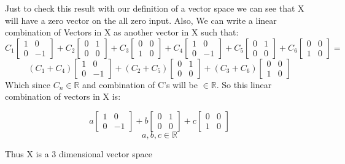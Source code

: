 \documentclass[12pt]{article}
\begin{document}
Just to check this result with our definition of a vector space we can see that X will have a zero vector on the all zero input. Also, We can write a linear combination of Vectors in X as another vector in X such that:
\[
C_1
\begin{bmatrix}
1& 0\\
0 & -1
\end{bmatrix}
+ C_2
\begin{bmatrix}
0 & 1\\
0 & 0
\end{bmatrix}
+ C_3
\begin{bmatrix}
0 & 0\\
1 & 0
\end{bmatrix}
+
C_4
\begin{bmatrix}
1& 0\\
0 & -1
\end{bmatrix}
+ C_5
\begin{bmatrix}
0 & 1\\
0 & 0
\end{bmatrix}
+ C_6
\begin{bmatrix}
0 & 0\\
1 & 0
\end{bmatrix}
=
\]
\[
(C_1 + C_4)
\begin{bmatrix}
1& 0\\
0 & -1
\end{bmatrix}
+ (C_2 + C_5)
\begin{bmatrix}
0 & 1\\
0 & 0
\end{bmatrix}
+ (C_3 + C_6)
\begin{bmatrix}
0 & 0\\
1 & 0
\end{bmatrix}
\]
Which since $C_n \in \mathbb{R}$ and combination of C's will be $\in \mathbb{R}$. So this linear combination of vectors in X is:

\[
a
\begin{bmatrix}
1& 0\\
0 & -1
\end{bmatrix}
+ b
\begin{bmatrix}
0 & 1\\
0 & 0
\end{bmatrix}
+ c
\begin{bmatrix}
0 & 0\\
1 & 0
\end{bmatrix}
\]
$$a, b, c \in \mathbb{R} $$

Thus X is a 3 dimensional vector space
\end{document}
